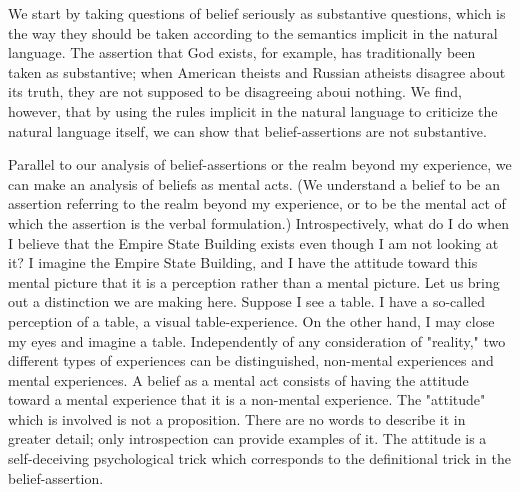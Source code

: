 \documentclass[10pt,twoside]{memoir}
\begin{document}
We start by taking questions of belief seriously as substantive questions, 
which is the way they should be taken according to the semantics implicit in 
the natural language. The assertion that God exists, for example, has 
traditionally been taken as substantive; when American theists and Russian 
atheists disagree about its truth, they are not supposed to be disagreeing 
aboui nothing. We find, however, that by using the rules implicit in the 
natural language to criticize the natural language itself, we can show that 
belief-assertions are not substantive. 

Parallel to our analysis of belief-assertions or the realm beyond my 
experience, we can make an analysis of beliefs as mental acts. (We 
understand a belief to be an assertion referring to the realm beyond my 
experience, or to be the mental act of which the assertion is the verbal 
formulation.) Introspectively, what do I do when I believe that the Empire 
State Building exists even though I am not looking at it? I imagine the 
Empire State Building, and I have the attitude toward this mental picture 
that it is a perception rather than a mental picture. Let us bring out a 
distinction we are making here. Suppose I see a table. I have a so-called 
perception of a table, a visual table-experience. On the other hand, I may 
close my eyes and imagine a table. Independently of any consideration of 
"reality," two different types of experiences can be distinguished, 
non-mental experiences and mental experiences. A belief as a mental act 
consists of having the attitude toward a mental experience that it is a 
non-mental experience. The "attitude" which is involved is not a 
proposition. There are no words to describe it in greater detail; only 
introspection can provide examples of it. The attitude is a self-deceiving 
psychological trick which corresponds to the definitional trick in the 
belief-assertion. 
\end{document}
